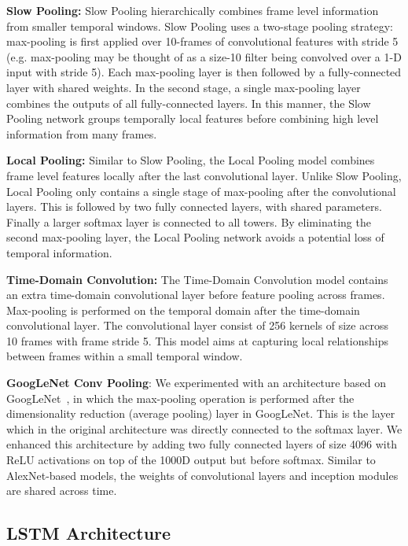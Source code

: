 \documentclass[10pt,twocolumn,letterpaper]{article}
\begin{document}
{\bf Slow Pooling:} Slow Pooling hierarchically combines frame level information from smaller temporal windows. Slow Pooling uses a two-stage pooling strategy: max-pooling is first applied over 10-frames of convolutional features with stride 5 (e.g. max-pooling may be thought of as a size-10 filter being convolved over a 1-D input with stride 5). Each max-pooling layer is then followed by a fully-connected layer with shared weights. In the second stage, a single max-pooling layer combines the outputs of all fully-connected layers. In this manner, the Slow Pooling network groups temporally local features before combining high level information from many frames.

{\bf Local Pooling:} Similar to Slow Pooling, the Local Pooling model combines frame level features locally after the last convolutional layer. Unlike Slow Pooling, Local Pooling only contains a single stage of max-pooling after the convolutional layers. This is followed by two fully connected layers, with shared parameters. Finally a larger softmax layer is connected to all towers. By eliminating the second max-pooling layer, the Local Pooling network avoids a potential loss of temporal information.

{\bf Time-Domain Convolution:} The Time-Domain Convolution model contains an extra time-domain convolutional layer before feature pooling across frames. Max-pooling is performed on the temporal domain after the time-domain convolutional layer. The convolutional layer consist of 256 kernels of size  across 10 frames with frame stride 5. This model aims at capturing local relationships between frames within a small temporal window.

{\bf GoogLeNet Conv Pooling}: We experimented with an architecture based on GoogLeNet~\cite{szegedy14going}, in which the max-pooling operation
is performed after the dimensionality reduction (average pooling) layer in GoogLeNet. This is the layer which in the original architecture was
directly connected to the softmax layer. We enhanced this architecture by adding two fully connected
layers of size 4096 with ReLU activations on top of the 1000D output but before softmax. Similar to AlexNet-based models, the weights of convolutional layers
 and inception modules are shared across time.

\vspace{-.6em}
\subsection{LSTM Architecture}
\vspace{-.6em}
\end{document}
